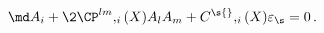 \begin{equation}
  \md A_i+\2\CP^{lm}{},_{i}(X) A_l A_m +C^\s{},_{i}(X)\varepsilon_\s
  = 0\,. \label{eqsnontop}
\end{equation}

